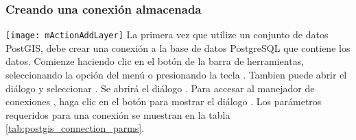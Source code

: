 \subsubsection{Creando una conexi\'on almacenada}\label{sec:postgis_stored}

\texttt{[image: mActionAddLayer]} La primera vez que utilize un conjunto de datos PostGIS, debe crear una conexi\'on a la base de datos PostgreSQL que contiene los datos. Comienze haciendo clic en el bot\'on  de la barra de herramientas, seleccionando la opci\'on 
 del men\'u  o presionando la tecla . Tambien puede abrir el di\'alogo  y seleccionar .
Se abrir\'a el di\'alogo . Para accesar al manejador de conexiones , haga clic en el bot\'on  para mostrar el di\'alogo  . Los par\'ametros requeridos para una conexi\'on se muestran en la tabla \ref{tab:postgis_connection_parms}.

